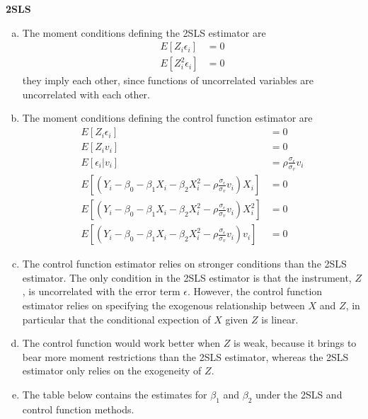 \documentclass[11pt]{article}
\begin{document}
\bigskip \textbf{2SLS}

\begin{enumerate}[(a)]

	\item The moment conditions defining the 2SLS estimator are
	\begin{align*}
		E \left[ Z_i \epsilon_i \right] &= 0 \\
		E \left[ Z_i^2 \epsilon_i \right] &= 0
	\end{align*}
	they imply each other, since functions of uncorrelated variables are uncorrelated with each other.

	\item The moment conditions defining the control function estimator are
	\begin{align*}
		E \left[ Z_i \epsilon_i \right] &= 0 \\
		E \left[ Z_i v_i \right] &= 0 \\
		E \left[ \epsilon_i | v_i \right] &= \rho \frac{\sigma_{\epsilon}}{\sigma_v} v_i \\
		E \left[ (Y_i - \beta_0 - \beta_1 X_i - \beta_2 X_i^2 - \rho \frac{\sigma_{\epsilon}}{\sigma_v} v_i)X_i \right] &= 0 \\
		E \left[ (Y_i - \beta_0 - \beta_1 X_i - \beta_2 X_i^2 - \rho \frac{\sigma_{\epsilon}}{\sigma_v} v_i)X_i^2 \right] &= 0 \\
		E \left[ (Y_i - \beta_0 - \beta_1 X_i - \beta_2 X_i^2 - \rho \frac{\sigma_{\epsilon}}{\sigma_v} v_i)v_i \right] &= 0
	\end{align*}

	\item The control function estimator relies on stronger conditions than the 2SLS estimator. The only condition in the 2SLS estimator is that the instrument, $Z$, is uncorrelated with the error term $\epsilon$. However, the control function estimator relies on specifying the exogenous relationship between $X$ and $Z$, in particular that the conditional expection of $X$ given $Z$ is linear.

	\item The control function would work better when $Z$ is weak, because it brings to bear more moment restrictions than the 2SLS estimator, whereas the 2SLS estimator only relies on the exogeneity of $Z$. %

	\item

	The table below contains the estimates for $\beta_1$ and $\beta_2$ under the 2SLS and control function methods.


\end{enumerate}
\end{document}
